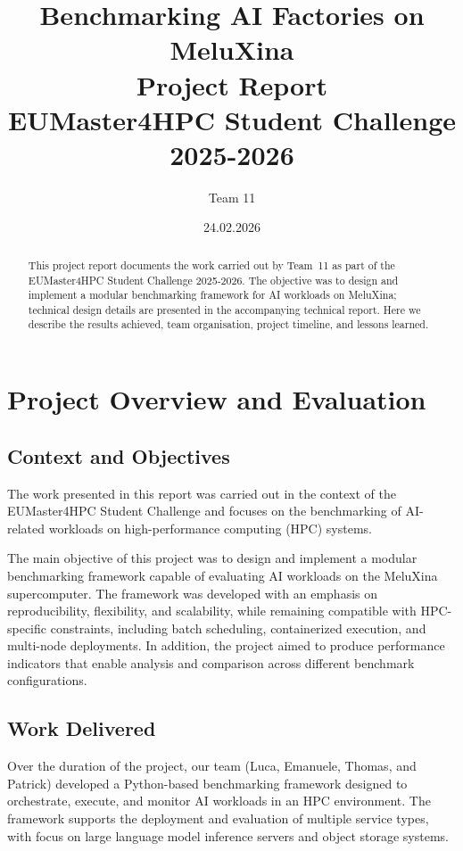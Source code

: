\documentclass[11pt,a4paper]{article}
\title{%
    \vspace{-1cm}
    \textbf{Benchmarking AI Factories on MeluXina}\\[0.5cm]
    \large Project Report\\[0.3cm]
    \normalsize EUMaster4HPC Student Challenge 2025-2026
}
\author{%
    Team 11
}
\date{24.02.2026}
\begin{document}
\maketitle

\begin{abstract}
This project report documents the work carried out by Team~11 as part of the EUMaster4HPC Student Challenge 2025-2026. The objective was to design and implement a modular benchmarking framework for AI workloads on MeluXina; technical design details are presented in the accompanying technical report. Here we describe the results achieved, team organisation, project timeline, and lessons learned.
\end{abstract}

\tableofcontents

\section{Project Overview and Evaluation}

\subsection{Context and Objectives}

The work presented in this report was carried out in the context of the EUMaster4HPC Student Challenge and focuses on the benchmarking of AI-related workloads on high-performance computing (HPC) systems.

The main objective of this project was to design and implement a modular benchmarking framework capable of evaluating AI workloads on the MeluXina supercomputer. The framework was developed with an emphasis on reproducibility, flexibility, and scalability, while remaining compatible with HPC-specific constraints, including batch scheduling, containerized execution, and multi-node deployments. In addition, the project aimed to produce performance indicators that enable analysis and comparison across different benchmark configurations.

\subsection{Work Delivered}

Over the duration of the project, our team (Luca, Emanuele, Thomas, and Patrick) developed a Python-based benchmarking framework designed to orchestrate, execute, and monitor AI workloads in an HPC environment. The framework supports the deployment and evaluation of multiple service types, with focus on large language model inference servers and object storage systems.
\end{document}
